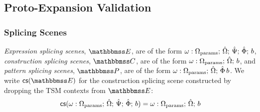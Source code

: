 \subsection{Proto-Expansion Validation}
\subsubsection{Splicing Scenes}
\emph{Expression splicing scenes}, $\escenev$, are of the form $\omega : \Omega_\text{params};\,{\hat\Omega};\,\hat{\Psi};\,\hat\Phi;\,b$, \emph{construction splicing scenes}, $\cscenev$, are of the form $\omega : \Omega_\text{params};\,{\hat\Omega};\,b$, and \emph{pattern splicing scenes}, $\pscenev$, are of the form $\omega : \Omega_\text{params};\,{\hat\Omega};\,\hat\Phi\,b$. We write $\csfrom{\escenev}$ for the construction splicing scene constructed by dropping the TSM contexts from $\escenev$:
\[\mathsf{cs}(\omega : \Omega_\text{params};\,{\hat\Omega};\,\hat{\Psi};\,\hat\Phi;\,b) = \omega : \Omega_\text{params};\,{\hat\Omega};\,b\]

